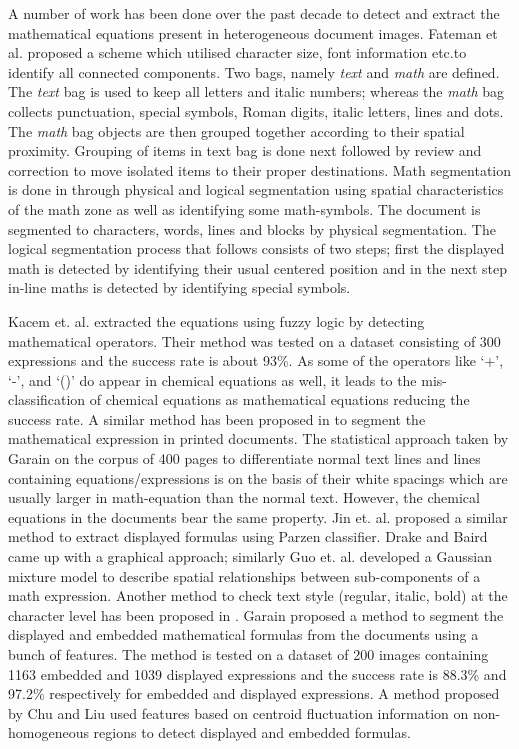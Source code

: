 \documentclass[12pt]{IEEEtran}
\begin{document}
  A number of work has been done over the past decade to detect and extract the mathematical equations present in heterogeneous document images. 
  Fateman et al. \cite{fateman_96} proposed a scheme which utilised character size, font information etc.\@ to identify all connected components. Two bags, namely {\em text}
  and {\em math} are defined. The {\em text }bag is used to  keep   all letters and italic numbers;
  whereas the {\em  math} bag collects punctuation, special symbols, Roman digits, italic letters, lines and dots. The
 {\em math} bag objects are then grouped together according to their spatial proximity. Grouping of items in text bag is
  done next followed by review and correction to move isolated items to their proper destinations.
  Math segmentation is done in \cite{toumit_99} through physical and logical segmentation using spatial characteristics of the math zone as well
  as identifying some math-symbols. The document is segmented to characters, words, lines and blocks by physical segmentation. The logical segmentation process that follows consists of two steps;
  first the displayed math is detected by identifying their usual centered position and in the next step in-line maths is detected by identifying special symbols. 
 
   Kacem et. al. \cite{kacem_01} extracted the equations using fuzzy logic by detecting mathematical  
  operators. Their method was tested on a dataset consisting of 300 expressions and the success rate is about 93\%.
  As some of the operators like `+', `-', and `()' do appear in chemical equations as well, it leads to the 
  mis-classification of chemical equations  as mathematical equations reducing the success rate.
A similar method has been proposed in \cite{suzuki_03} to segment 
  the mathematical expression in printed documents.
  The statistical approach taken by Garain \cite{Garain_05} on the corpus of 400 pages to differentiate normal 
  text lines and lines containing equations/expressions is on the basis of their white spacings which are usually larger in math-equation than the normal text. However, the    
  chemical equations in the  documents bear the same property. Jin et. al.\cite{jin_03} proposed a similar method to extract displayed formulas using  Parzen classifier.
  Drake and Baird \cite{drake_05} came up with a graphical approach; similarly Guo et. al.\cite{guo_07} developed a Gaussian mixture model
  to describe spatial relationships between sub-components of a math expression. 
   Another method to check text style (regular, italic, bold) at the character level has been proposed in \cite{Garain_01}.
   Garain \cite{Garain_09} proposed a method to segment the displayed and embedded mathematical formulas from the documents using a 
   bunch of features. The method is tested on a dataset of 200 images containing 1163 embedded and 1039 displayed expressions
   and the success rate is 88.3\% and 97.2\% respectively for embedded and displayed expressions.
   A method proposed by Chu and Liu \cite{liu_13} used features based on centroid fluctuation 
  information on non-homogeneous regions to detect displayed and embedded formulas. 
  
\end{document}
